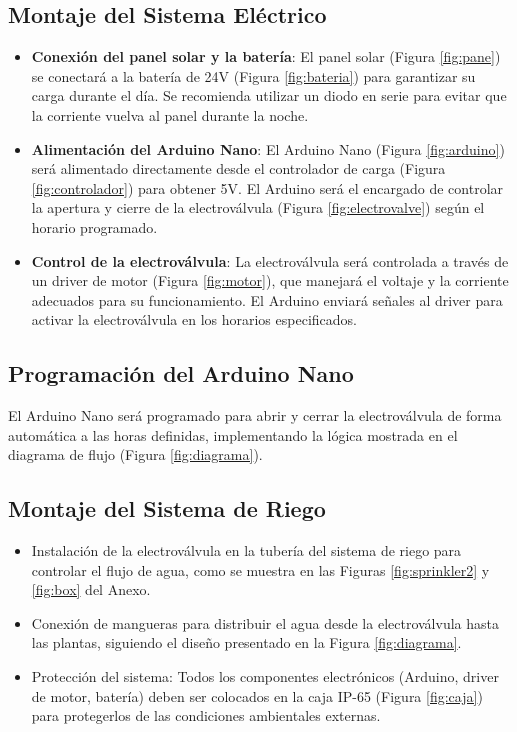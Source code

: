 \documentclass[12pt]{article}
\begin{document}
\subsection{Montaje del Sistema Eléctrico}
\begin{itemize}
      \item \textbf{Conexión del panel solar y la batería}: El panel solar (Figura \ref{fig:pane}) se conectará a la batería de 24V (Figura \ref{fig:bateria}) para garantizar su carga durante el día. Se recomienda utilizar un diodo en serie para evitar que la corriente vuelva al panel durante la noche.

      \item \textbf{Alimentación del Arduino Nano}: El Arduino Nano (Figura \ref{fig:arduino}) será alimentado directamente desde el controlador de carga (Figura \ref{fig:controlador}) para obtener 5V. El Arduino será el encargado de controlar la apertura y cierre de la electroválvula (Figura \ref{fig:electrovalve}) según el horario programado.

      \item \textbf{Control de la electroválvula}: La electroválvula será controlada a través de un driver de motor (Figura \ref{fig:motor}), que manejará el voltaje y la corriente adecuados para su funcionamiento. El Arduino enviará señales al driver para activar la electroválvula en los horarios especificados.
\end{itemize}

\subsection{Programación del Arduino Nano}
El Arduino Nano será programado para abrir y cerrar la electroválvula de forma automática a las horas definidas, implementando la lógica mostrada en el diagrama de flujo (Figura \ref{fig:diagrama}).

\subsection{Montaje del Sistema de Riego}
\begin{itemize}
      \item Instalación de la electroválvula en la tubería del sistema de riego para controlar el flujo de agua, como se muestra en las Figuras \ref{fig:sprinkler2} y \ref{fig:box} del Anexo.

      \item Conexión de mangueras para distribuir el agua desde la electroválvula hasta las plantas, siguiendo el diseño presentado en la Figura \ref{fig:diagrama}.

      \item Protección del sistema: Todos los componentes electrónicos (Arduino, driver de motor, batería) deben ser colocados en la caja IP-65 (Figura \ref{fig:caja}) para protegerlos de las condiciones ambientales externas.
\end{itemize}
\newpage
\end{document}
